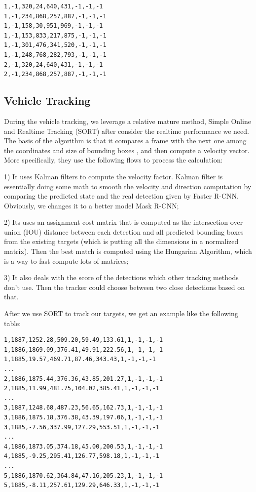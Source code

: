 \documentclass[10pt,twocolumn,letterpaper]{article}
\begin{document}
	\begin{lstlisting}
1,-1,320,24,640,431,-1,-1,-1
1,-1,234,868,257,887,-1,-1,-1
1,-1,158,30,951,969,-1,-1,-1
1,-1,153,833,217,875,-1,-1,-1
1,-1,301,476,341,520,-1,-1,-1
1,-1,248,768,282,793,-1,-1,-1
2,-1,320,24,640,431,-1,-1,-1
2,-1,234,868,257,887,-1,-1,-1
	\end{lstlisting}
	
\subsection{Vehicle Tracking}

During the vehicle tracking, we leverage a relative mature method, Simple Online and Realtime Tracking (SORT)\cite{bewley2016simple} after consider the realtime performance we need. The basis of the algorithm is that it compares a frame with the next one among the coordinates and size of bounding boxes , and then compute a velocity vector. More specifically, they use the following flows to process the calculation:

1) It uses Kalman filters to compute the velocity factor. Kalman filter is essentially doing some math to smooth the velocity and direction computation by comparing the predicted state and the real detection given by Faster R-CNN. Obviously, we changes it to a better model Mask R-CNN;

2) Its uses an assignment cost matrix that is computed as the intersection over union (IOU) distance between each detection and all predicted bounding boxes from the existing targets (which is putting all the dimensions in a normalized matrix). Then the best match is computed using the Hungarian Algorithm, which is a way to fast compute lots of matrices;

3) It also deals with the score of the detections which other tracking methods don't use. Then the tracker could choose between two close detections based on that.

After we use SORT to track our targets, we get an example like the following table:

	\begin{lstlisting}
1,1887,1252.28,509.20,59.49,133.61,1,-1,-1,-1
1,1886,1869.09,376.41,49.91,222.56,1,-1,-1,-1
1,1885,19.57,469.71,87.46,343.43,1,-1,-1,-1
...
2,1886,1875.44,376.36,43.85,201.27,1,-1,-1,-1
2,1885,11.99,481.75,104.02,385.41,1,-1,-1,-1
...
3,1887,1248.68,487.23,56.65,162.73,1,-1,-1,-1
3,1886,1875.18,376.38,43.39,197.06,1,-1,-1,-1
3,1885,-7.56,337.99,127.29,553.51,1,-1,-1,-1
...
4,1886,1873.05,374.18,45.00,200.53,1,-1,-1,-1
4,1885,-9.25,295.41,126.77,598.18,1,-1,-1,-1
...
5,1886,1870.62,364.84,47.16,205.23,1,-1,-1,-1
5,1885,-8.11,257.61,129.29,646.33,1,-1,-1,-1
	\end{lstlisting}
	
\end{document}
